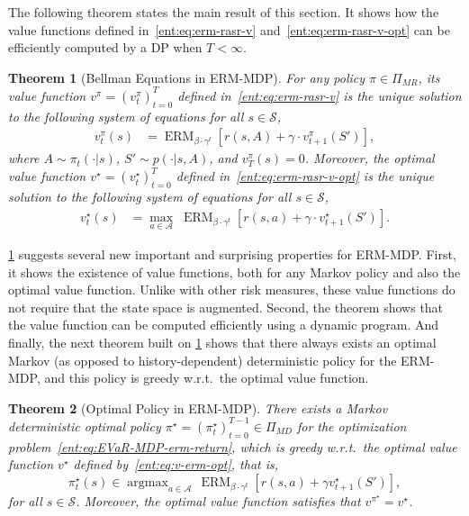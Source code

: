 \documentclass[twoside]{article}
\newcommand{\states}{\mathcal{S}}
\newcommand{\actions}{\mathcal{A}}
\newcommand{\opt}{^\star}
\DeclareMathOperator*{\argmax}{argmax}
\newcommand{\erm}[2]{\operatorname{ERM}_{#1}\left[#2\right]}
\theoremstyle{plain}
\newtheorem{theorem}{Theorem}[section]
\theoremstyle{definition}
\theoremstyle{remark}
\begin{document}
The following theorem states the main result of this section. It shows how the value functions defined in~\eqref{ent:eq:erm-rasr-v} and~\eqref{ent:eq:erm-rasr-v-opt} can be efficiently computed by a DP when $T < \infty$. 
%
\begin{theorem}[Bellman Equations in ERM-MDP]\label{ent:thm:dynamic-program}
For any policy $\pi\in \Pi_{MR}$, its value function $v^\pi=(v^\pi_t)_{t=0}^T$ defined in~\eqref{ent:eq:erm-rasr-v} is the unique solution to the following system of equations for all $s\in\states$,
%
\begin{align}
\label{ent:eq:v-erm-pi}
  v_t^{\pi}(s) &= \erm{\beta \cdot \gamma^t} {r(s,A) + \gamma \cdot  v_{t+1}^{\pi}(S')}
 ,
\end{align}
%
where $A \sim \pi_t(\cdot|s)$, $S' \sim p(\cdot|s,A)$, and $v_T^{\pi}(s) = 0$. Moreover, the optimal value function $v\opt=(v\opt_t)_{t=0}^T$ defined in~\eqref{ent:eq:erm-rasr-v-opt} is the unique solution to the following system of equations for all $s\in\states$,
%
\begin{align}
\label{ent:eq:v-erm-opt}
  v\opt_t(s) &= \max_{a\in \actions} \; \erm{\beta \cdot \gamma^t} {r(s,a) + \gamma \cdot  v_{t+1}\opt(S') }
.
\end{align}
%
\end{theorem}

\cref{ent:thm:dynamic-program} suggests several new important and surprising properties for ERM-MDP. First, it shows the existence of value functions, both for any Markov policy and also the optimal value function. Unlike with other risk measures, these value functions do not require that the state space is augmented. Second, the theorem shows that the value function can be computed efficiently using a dynamic program. And finally, the next theorem built on \cref{ent:thm:dynamic-program} shows that there always exists an optimal Markov (as opposed to history-dependent) deterministic policy for the ERM-MDP, and this policy is greedy w.r.t.~the optimal value function.

\begin{theorem}[Optimal Policy in ERM-MDP]\label{ent:th:optimal_deterministic}
There exists a Markov deterministic optimal policy $\pi\opt = (\pi_t\opt)_{t=0}^{T-1}\in\Pi_{MD}$ for the optimization problem~\eqref{ent:eq:EVaR-MDP-erm-return}, which is greedy w.r.t.~the optimal value function $v\opt$ defined by~\eqref{ent:eq:v-erm-opt}, that is, 
%
\begin{equation}\label{ent:eq:pol-greedy}
\pi\opt_t(s) \in \argmax_{a\in\actions} \,\erm{\beta \cdot \gamma^t} { r(s,a) + \gamma  v\opt_{t+1}(S')},
\end{equation}
%
for all $s\in\states$. Moreover, the optimal value function satisfies that $v^{\pi\opt } = v\opt$.
\end{theorem}
\end{document}
